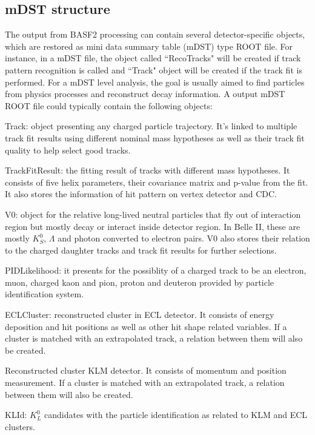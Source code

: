 \subsection{mDST structure}

The output from BASF2 processing can contain several detector-specific objects, which are restored as mini data summary table (mDST) type ROOT file. For instance, in a mDST file, the object called ``RecoTracks" will be created if track pattern recognition is called and ``Track" object will be created if the track fit is performed. For a mDST level analysis, the goal is usually aimed to find particles from physics processes and reconstruct decay information. A output mDST ROOT file could typically contain the following objects:

\textbullet \space Track: object presenting any charged particle trajectory. It's linked to multiple track fit results using different nominal mass hypotheses as well as their track fit quality to help select good tracks.  

\textbullet \space TrackFitResult: the fitting result of tracks with different mass hypotheses. It consists of five helix parameters, their covariance matrix and p-value from the fit. It also stores the information of hit pattern on vertex detector and CDC. 

\textbullet \space V0: object for the relative long-lived neutral particles that fly out of interaction region but mostly decay or interact inside detector region. In Belle II, these are mostly $K_S^0$, $\Lambda$ and photon converted to electron pairs. V0 also stores their relation to the charged daughter tracks and track fit results for further selections.


\textbullet \space PIDLikelihood: it presents for the possiblity of a charged track to be an electron, muon, charged kaon and pion, proton and deuteron provided by particle identification system. 

\textbullet \space ECLCluster: reconstructed cluster in ECL detector. It consists of energy deposition and hit positions as well as other hit shape related variables. If a cluster is matched with an extrapolated track, a relation between them will also be created. 

\textbullet \space Reconstructed cluster KLM detector. It consists of momentum and position measurement. If a cluster is matched with an extrapolated track, a relation between them will also be created. 

\textbullet \space KLId: $K_L^0$ candidates with the particle identification as related to KLM and ECL clusters. 

